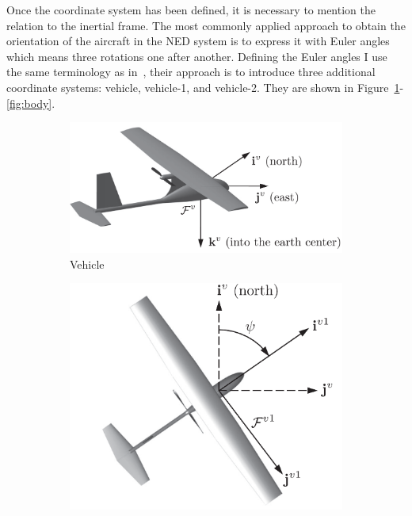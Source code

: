 Once the coordinate system has been defined, it is necessary to mention the relation to the inertial frame. The most commonly applied approach to obtain the orientation of the aircraft in the NED system is to express it with Euler angles which means three rotations one after another. Defining the Euler angles I use the same terminology as in~\cite{EKF-UAS-2}, their approach is to introduce three additional coordinate systems: vehicle, vehicle-1, and vehicle-2. They are shown in Figure~\ref{fig:vehicle}-\ref{fig:body}.

\begin{figure}[!ht]
    \centering
    \begin{subfigure}{0.38\textwidth}
        \centering
         \includegraphics[width=\textwidth]{figures/vehicle.png}
         \caption{Vehicle}\label{fig:vehicle}
    \end{subfigure}
    \begin{subfigure}{0.38\textwidth}
        \centering
         \includegraphics[width=\textwidth]{figures/vehicle-1.png}

\end{subfigure}
\end{figure}
